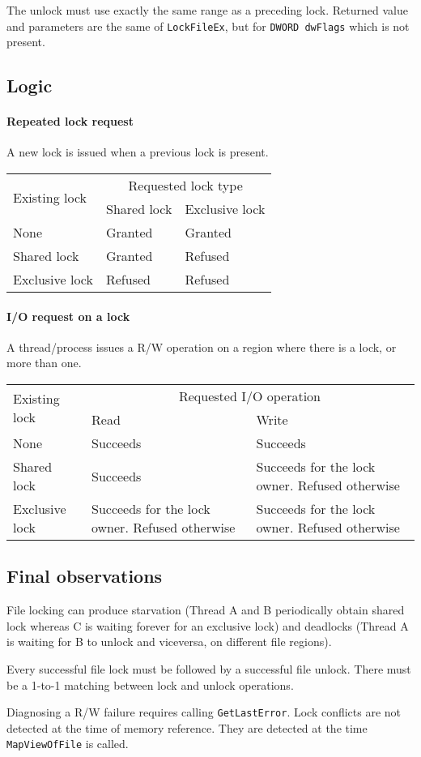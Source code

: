 The unlock must use exactly the same range as a preceding lock. Returned value and parameters are the same of \texttt{LockFileEx}, but for \texttt{DWORD dwFlags} which is not present.

\subsection{Logic}
\paragraph{Repeated lock request}
A new lock is issued when a previous lock is present.
\begin{center}
\begin{tabular}{|l|l|l|}
\hline 
\multirow{2}{*}{Existing lock} &  \multicolumn{2}{c|}{Requested lock type} \\\cline{2-3}
 & Shared lock & Exclusive lock \\
\hline 
None & Granted & Granted \\ 
\hline 
Shared lock & Granted & Refused \\ 
\hline 
Exclusive lock & Refused & Refused \\ 
\hline 
\end{tabular}
\end{center}

\paragraph{I/O request on a lock}
A thread/process issues a R/W operation on a region where there is a lock, or more than one.
\begin{center}
\begin{tabularx}{\textwidth}{|l|X|X|}
\hline 
\multirow{2}{*}{Existing lock} &  \multicolumn{2}{c|}{Requested I/O operation} \\\cline{2-3}
 & Read & Write \\
\hline 
None & Succeeds & Succeeds \\ 
\hline 
Shared lock & Succeeds & Succeeds for the lock owner. Refused otherwise \\ 
\hline 
Exclusive lock & Succeeds for the lock owner. Refused otherwise & Succeeds for the lock owner. Refused otherwise \\ 
\hline 
\end{tabularx}
\end{center}

\subsection{Final observations}
File locking can produce starvation (Thread A and B periodically obtain shared lock whereas C is waiting forever for an exclusive lock) and deadlocks (Thread A is waiting for B to unlock and viceversa, on different file regions).

Every successful file lock must be followed by a successful file unlock. There must be a 1-to-1 matching between lock and unlock operations.

Diagnosing a R/W failure requires calling \texttt{GetLastError}. Lock conflicts are not detected at the time of memory reference. They are detected at the time \texttt{MapViewOfFile} is called.
